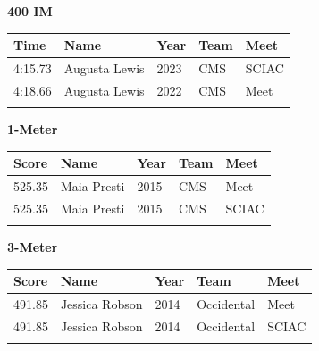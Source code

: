 \vspace{1.2em}
\noindent\begin{minipage}[t]{0.98\textwidth}
\centering
\textbf{\textcolor{teamprimary}{400 IM}}\par
\vspace{0.5em}
\centering
\small
\renewcommand{\arraystretch}{1.0}
\setlength{\tabcolsep}{4pt}
\begin{tabular}{@{}p{2.5cm}p{4.5cm}p{1.5cm}p{2.5cm}p{2.5cm}@{}}
\toprule
\textbf{Time} & \textbf{Name} & \textbf{Year} & \textbf{Team} & \textbf{Meet} \\
\midrule
4:15.73 & Augusta Lewis & 2023 & CMS & SCIAC \\
4:18.66 & Augusta Lewis & 2022 & CMS & Meet \\
\bottomrule
\vspace{0.5em}
\end{tabular}
\end{minipage}
\vspace{1.2em}
\noindent\begin{minipage}[t]{0.98\textwidth}
\centering
\textbf{\textcolor{teamprimary}{1-Meter}}\par
\vspace{0.5em}
\centering
\small
\renewcommand{\arraystretch}{1.0}
\setlength{\tabcolsep}{4pt}
\begin{tabular}{@{}p{2.5cm}p{4.5cm}p{1.5cm}p{2.5cm}p{2.5cm}@{}}
\toprule
\textbf{Score} & \textbf{Name} & \textbf{Year} & \textbf{Team} & \textbf{Meet} \\
\midrule
525.35 & Maia Presti & 2015 & CMS & Meet \\
525.35 & Maia Presti & 2015 & CMS & SCIAC \\
\bottomrule
\vspace{0.5em}
\end{tabular}
\end{minipage}
\vspace{1.2em}
\noindent\begin{minipage}[t]{0.98\textwidth}
\centering
\textbf{\textcolor{teamprimary}{3-Meter}}\par
\vspace{0.5em}
\centering
\small
\renewcommand{\arraystretch}{1.0}
\setlength{\tabcolsep}{4pt}
\begin{tabular}{@{}p{2.5cm}p{4.5cm}p{1.5cm}p{2.5cm}p{2.5cm}@{}}
\toprule
\textbf{Score} & \textbf{Name} & \textbf{Year} & \textbf{Team} & \textbf{Meet} \\
\midrule
491.85 & Jessica Robson & 2014 & Occidental & Meet \\
491.85 & Jessica Robson & 2014 & Occidental & SCIAC \\
\bottomrule
\vspace{0.5em}
\end{tabular}
\end{minipage}

